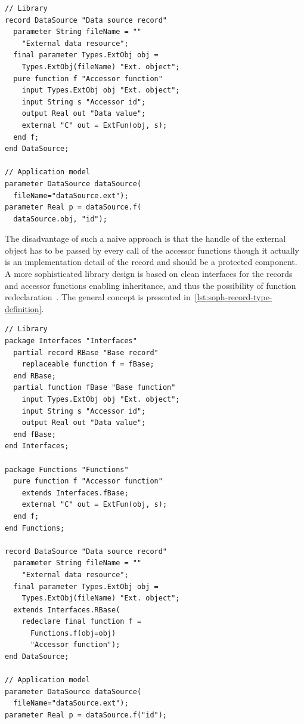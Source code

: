 \documentclass{modelica}
\begin{document}
\begin{lstlisting}[caption=Naive record type definition, label=lst:naive-record-type-definition, language=modelica]
// Library
record DataSource "Data source record"
  parameter String fileName = ""
    "External data resource";
  final parameter Types.ExtObj obj =
    Types.ExtObj(fileName) "Ext. object";
  pure function f "Accessor function"
    input Types.ExtObj obj "Ext. object";
    input String s "Accessor id";
    output Real out "Data value";
    external "C" out = ExtFun(obj, s);
  end f;
end DataSource;

// Application model
parameter DataSource dataSource(
  fileName="dataSource.ext");
parameter Real p = dataSource.f(
  dataSource.obj, "id");
\end{lstlisting}

The disadvantage of such a naive approach is that the handle of the external object has to be passed by every call of the accessor functions though it actually is an implementation detail of the record and should be a protected component.
A more sophisticated library design is based on clean interfaces for the records and accessor functions enabling inheritance, and thus the possibility of function redeclaration~\cite{modelisax2018hints}.
The general concept is presented in~\autoref{lst:soph-record-type-definition}.

\begin{lstlisting}[caption=Sophisticated record type definition, label=lst:soph-record-type-definition, language=modelica]
// Library
package Interfaces "Interfaces"
  partial record RBase "Base record"
    replaceable function f = fBase;
  end RBase;
  partial function fBase "Base function"
    input Types.ExtObj obj "Ext. object";
    input String s "Accessor id";
    output Real out "Data value";
  end fBase;
end Interfaces;

package Functions "Functions"
  pure function f "Accessor function"
    extends Interfaces.fBase;
    external "C" out = ExtFun(obj, s);
  end f;
end Functions;

record DataSource "Data source record"
  parameter String fileName = ""
    "External data resource";
  final parameter Types.ExtObj obj =
    Types.ExtObj(fileName) "Ext. object";
  extends Interfaces.RBase(
    redeclare final function f =
      Functions.f(obj=obj)
      "Accessor function");
end DataSource;

// Application model
parameter DataSource dataSource(
  fileName="dataSource.ext");
parameter Real p = dataSource.f("id");
\end{lstlisting}
\end{document}
